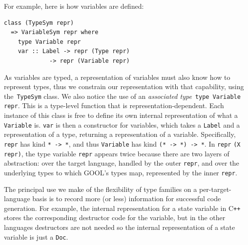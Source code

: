 \documentclass[sigplan,review,anonymous,prologue,dvipsnames]{acmart}
\newcommand{\Cplusplus}{C\texttt{++}}
\begin{document}
For example, here is how variables are defined:
\begin{lstlisting}
class (TypeSym repr)
  => VariableSym repr where
    type Variable repr
    var :: Label -> repr (Type repr)
             -> repr (Variable repr)
\end{lstlisting}
As variables are typed, a representation of variables must also know how
to represent types, thus we constrain our representation with that capability,
using the~\verb|TypeSym| class.  We also notice the use of an
\emph{associated type}~\verb|type Variable repr|. This is a type-level
function that is representation-dependent.  Each instance of this class
is free to define its own internal representation of what a
\verb|Variable| is. \verb|var| is then a constructor for variables,
which takes a \verb|Label| and a representation of a type, returning
a representation of a variable.  Specifically, \verb|repr| has kind
\verb|* -> *|, and thus \verb|Variable| has kind \verb|(* -> *) -> *|.
In \verb|repr| \verb|(X repr)|, the type variable \verb|repr| appears
twice because there are two layers of abstraction: over the target
language, handled by the outer \verb|repr|, and over the underlying
types to which GOOL's types map, represented by the inner \verb|repr|.

The principal use we make of the flexibility of type families on a
per-target-language basis is to record more (or less) information for
successful code generation. For example, the internal representation for a 
state variable in \Cplusplus{} stores the corresponding destructor code for the 
variable, but in the other languages destructors are not needed so the internal 
representation of a state variable is just a \verb|Doc|.
\end{document}
